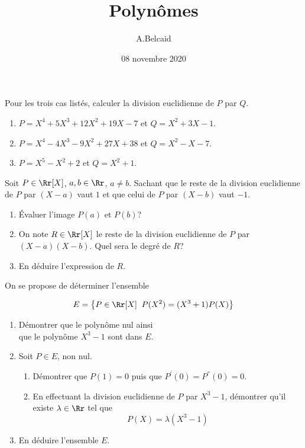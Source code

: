 \documentclass[10pt, a4paper, twocolumn]{homework}
\title{Polynômes}
\date{08 novembre 2020}
\author{A.Belcaid}
\begin{document}
\maketitle


Pour les trois cas listés, calculer la division euclidienne de $P$ par
$Q$.

\begin{enumerate}
  \item $P=X^4 + 5X^3 + 12X^2 + 19X - 7$ et $Q=X^2 + 3X-1$.
  \item $P=X^4-4X^3-9X^2+27X+38$ et $Q=X^2-X-7$.
  \item $P=X^5-X^2+2$ et $Q = X^2 +1$.
\end{enumerate}


Soit $P\in \Rr[X]$, $a,b\in \Rr$, $a\neq b$. Sachant que le reste de la
division euclidienne de $P$ par $(X-a)$ vaut $1$ et que celui de $P$ par
$(X-b)$ vaut $-1$.

\begin{enumerate}
  \item Évaluer l'image $P(a)$ et $P(b)$?
  \item On note $R\in \Rr[X]$ le reste de la division euclidienne de $P$ par
    $(X-a)(X-b)$. Quel  sera le degré de $R$?
  \item En déduire l'expression de $R$.
\end{enumerate}

On se propose de déterminer l'ensemble

\begin{equation*}
  E = \left\{P\in \Rr[X]\;\; P(X^2)=(X^3+1)P(X)\right\} 
\end{equation*}

\begin{enumerate}
  \item Démontrer que le polynôme nul ainsi\\  que le polynôme $X^3-1$ sont
    dans $E$.\\[4pt]
  \item Soit $P\in E$, non nul.
    \begin{enumerate}
      \small
    \item Démontrer que $P(1)=0$ puis que $P^{'}(0)=P^{''}(0)=0$.
    \item En effectuant la division euclidienne de $P$ par
      $X^3-1$, démontrer qu'il existe $\lambda\in \Rr$ tel que
      $$
      P(X) = \lambda (X^3-1)
      $$
    \end{enumerate}
  \item En déduire l'ensemble $E$.
\end{enumerate}
\end{document}
